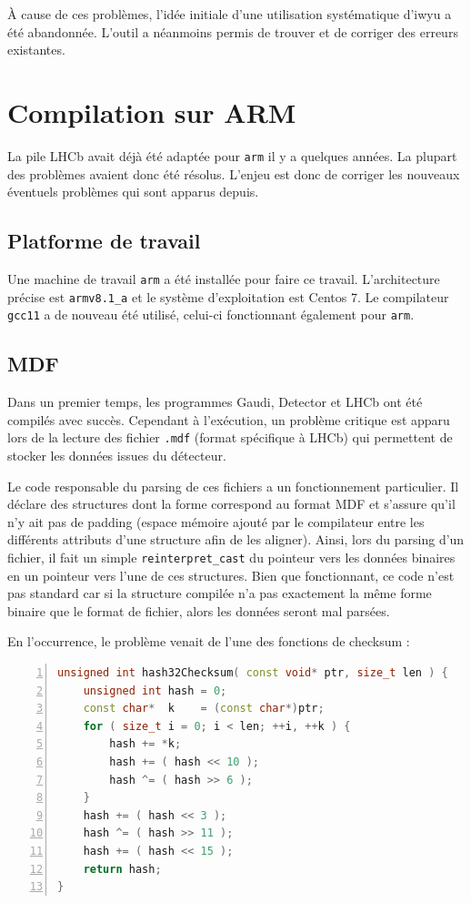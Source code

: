 \documentclass[a4paper,11pt]{report}
\begin{document}
À cause de ces problèmes, l'idée initiale d'une utilisation systématique d'iwyu a été abandonnée.
L'outil a néanmoins permis de trouver et de corriger des erreurs existantes.

\section{Compilation sur ARM}
La pile LHCb avait déjà été adaptée pour \verb'arm' il y a quelques années.
La plupart des problèmes avaient donc été résolus.
L'enjeu est donc de corriger les nouveaux éventuels problèmes qui sont apparus depuis.

\subsection{Platforme de travail}
Une machine de travail \verb'arm' a été installée pour faire ce travail.
L'architecture précise est \verb'armv8.1_a' et le système d'exploitation est Centos 7.
Le compilateur \verb'gcc11' a de nouveau été utilisé, celui-ci fonctionnant également pour \verb'arm'.

\subsection{MDF}
Dans un premier temps, les programmes Gaudi, Detector et LHCb ont été compilés avec succès.
Cependant à l'exécution, un problème critique est apparu lors de la lecture des fichier \verb'.mdf' (format spécifique à LHCb) qui permettent de stocker les données issues du détecteur.

Le code responsable du parsing de ces fichiers a un fonctionnement particulier.
Il déclare des structures dont la forme correspond au format MDF \cite{edms784588} et s'assure qu'il n'y ait pas de padding (espace mémoire ajouté par le compilateur entre les différents attributs d'une structure afin de les aligner).
Ainsi, lors du parsing d'un fichier, il fait un simple \verb'reinterpret_cast' du pointeur vers les données binaires en un pointeur vers l'une de ces structures.
Bien que fonctionnant, ce code n'est pas standard car si la structure compilée n'a pas exactement la même forme binaire que le format de fichier, alors les données seront mal parsées.

En l’occurrence, le problème venait de l'une des fonctions de checksum :

\begin{lstlisting}[language=c++,numbers=left]
unsigned int hash32Checksum( const void* ptr, size_t len ) {
    unsigned int hash = 0;
    const char*  k    = (const char*)ptr;
    for ( size_t i = 0; i < len; ++i, ++k ) {
        hash += *k;
        hash += ( hash << 10 );
        hash ^= ( hash >> 6 );
    }
    hash += ( hash << 3 );
    hash ^= ( hash >> 11 );
    hash += ( hash << 15 );
    return hash;
}
\end{lstlisting}
\end{document}
